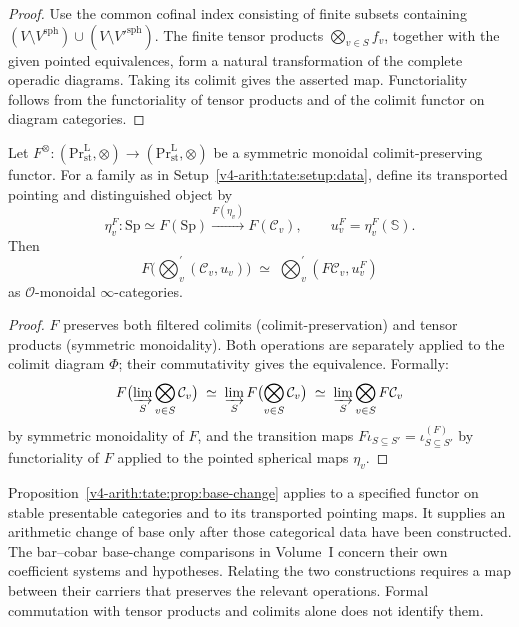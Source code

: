 \begin{proof}
Use the common cofinal index consisting of finite subsets
containing
\((V\setminus V^{\mathrm{sph}})\cup
 (V\setminus V'^{\mathrm{sph}})\).
The finite tensor products \(\bigotimes_{v\in S}f_v\), together
with the given pointed equivalences, form a natural
transformation of the complete operadic diagrams. Taking its
colimit gives the asserted map. Functoriality follows from the
functoriality of tensor products and of the colimit functor on
diagram categories.
\end{proof}

\begin{proposition}
\label{v4-arith:tate:prop:base-change}
Let
\(F^{\otimes}:(\mathrm{Pr}^{\mathrm{L}}_{\mathrm{st}},\otimes)\to(\mathrm{Pr}^{\mathrm{L}}_{\mathrm{st}},\otimes)\)
be a symmetric monoidal colimit-preserving functor. For a family
as in Setup~\ref{v4-arith:tate:setup:data}, define its transported
pointing and distinguished object by
\[
 \eta_v^F:\mathrm{Sp}\simeq F(\mathrm{Sp})
       \xrightarrow{F(\eta_v)}F(\mathcal C_v),
 \qquad u_v^F=\eta_v^F(\mathbb S).
\]
Then
\[
F\bigl(\bigotimes_{v}^{\prime}(\mathcal{C}_{v},u_{v})\bigr)\;\simeq\;\bigotimes_{v}^{\prime}(F\mathcal{C}_{v},u_v^F)
\]
as \(\mathcal{O}\)-monoidal \(\infty\)-categories.
\end{proposition}

\begin{proof}
\(F\) preserves both filtered colimits (colimit-preservation) and
tensor products (symmetric monoidality). Both operations are
separately applied to the colimit diagram \(\Phi\); their
commutativity gives the equivalence. Formally:
\[
F\bigl(\varinjlim_{S}\bigotimes_{v\in S}\mathcal{C}_{v}\bigr)\;\simeq\;\varinjlim_{S}F\bigl(\bigotimes_{v\in S}\mathcal{C}_{v}\bigr)\;\simeq\;\varinjlim_{S}\bigotimes_{v\in S}F\mathcal{C}_{v}
\]
by symmetric monoidality of \(F\), and the transition maps
\(F\iota_{S\subseteq S'}=\iota^{(F)}_{S\subseteq S'}\) by functoriality
of \(F\) applied to the pointed spherical maps \(\eta_{v}\).
\end{proof}

\begin{remark}
\label{v4-arith:tate:rem:vol-I-coherence}
Proposition~\ref{v4-arith:tate:prop:base-change} applies to a specified functor
on stable presentable categories and to its transported pointing
maps. It supplies an arithmetic change of base only after those
categorical data have been constructed. The bar--cobar base-change
comparisons in Volume~I concern their own coefficient systems
and hypotheses. Relating the two constructions requires a map
between their carriers that preserves the relevant operations.
Formal commutation with tensor products and colimits alone does
not identify them.
\end{remark}

